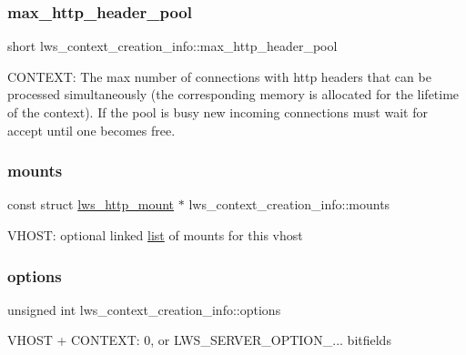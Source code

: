 \subsubsection{\texorpdfstring{max\+\_\+http\+\_\+header\+\_\+pool}{max\_http\_header\_pool}}
{\footnotesize\ttfamily short lws\+\_\+context\+\_\+creation\+\_\+info\+::max\+\_\+http\+\_\+header\+\_\+pool}

C\+O\+N\+T\+E\+XT\+: The max number of connections with http headers that can be processed simultaneously (the corresponding memory is allocated for the lifetime of the context). If the pool is busy new incoming connections must wait for accept until one becomes free. \mbox{\label{structlws__context__creation__info_a29d0df372d4609de6de6902f4017dbc3}} 
\subsubsection{\texorpdfstring{mounts}{mounts}}
{\footnotesize\ttfamily const struct \hyperlink{structlws__http__mount}{lws\+\_\+http\+\_\+mount} $\ast$ lws\+\_\+context\+\_\+creation\+\_\+info\+::mounts}

V\+H\+O\+ST\+: optional linked \hyperlink{protocollist-p}{list} of mounts for this vhost \mbox{\label{structlws__context__creation__info_a9d3b17a25e1fbc772f21eb4959a82724}} 
\subsubsection{\texorpdfstring{options}{options}}
{\footnotesize\ttfamily unsigned int lws\+\_\+context\+\_\+creation\+\_\+info\+::options}

V\+H\+O\+ST + C\+O\+N\+T\+E\+XT\+: 0, or L\+W\+S\+\_\+\+S\+E\+R\+V\+E\+R\+\_\+\+O\+P\+T\+I\+O\+N\+\_\+... bitfields \mbox{\label{structlws__context__creation__info_acf320db7f27298ac7e80bded9316ba12}} 
